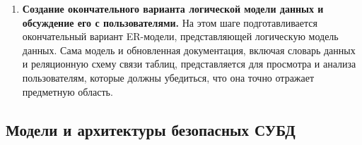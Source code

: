 \begin{enumerate}
\begin{itemize}
            \item ограничения для значений атрибутов. Определяются допустимые значения для атрибутов;

            \item целостность сущностей. Она достигается, если первичный ключ сущности не содержит Null-значений;

            \item ссылочная целостность. Она понимается так, что значение внешнего ключа должно обязательно
            присутствовать в первичном ключе одной из строк таблицы для родительской сущности;

            \item ограничения, накладываемые бизнес-правилами. Например, в случае с проектом БАНК может быть
            принято правило, запрещающее клиенту распоряжаться, скажем, более чем тремя счетами.
        \end{itemize}

    Сведения обо всех установленных ограничениях целостности данных помещаются в словарь данных.

    \item \textbf{Создание окончательного варианта логической модели данных и обсуждение его с пользователями.}
        На этом шаге подготавливается окончательный вариант ER-модели, представляющей логическую модель данных.
        Сама модель и обновленная документация, включая словарь данных и реляционную схему связи таблиц,
        представляется для просмотра и анализа пользователям, которые должны убедиться, что она точно
        отражает предметную область.
\end{enumerate}

\subsection{Модели и архитектуры безопасных СУБД}

